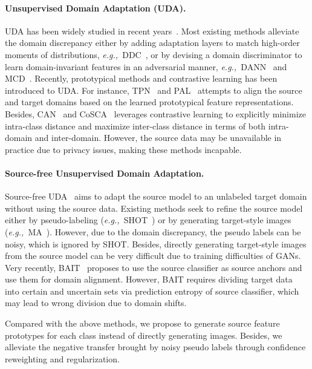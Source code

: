 \documentclass{article}
\def\eg{\emph{e.g.,~}}
\begin{document}
\paragraph{Unsupervised Domain Adaptation (UDA).}
UDA 
has been widely studied in recent years~\cite{tang2020unsupervised,jin2020minimum}. Most existing methods alleviate the domain discrepancy either by adding adaptation layers to match high-order moments of distributions, \eg DDC~\cite{Tzeng2014DeepDC}, 
or by devising a domain discriminator to learn domain-invariant features in an adversarial manner, \eg DANN~\cite{ganin2015unsupervised} and MCD~\cite{saito2018maximum}. 
Recently, prototypical methods and contrastive learning has been introduced to UDA. For instance, TPN~\cite{pan2019transferrable} and PAL~\cite{hu2020panda} attempts to align the source and target domains based on the learned prototypical feature representations. Besides, CAN~\cite{Kang2019ContrastiveAN} and CoSCA~\cite{Dai_2020_ACCV} leverages contrastive learning to explicitly minimize intra-class distance and maximize inter-class distance in terms of both intra-domain and inter-domain. However, the source data may be unavailable in practice due to privacy issues, making these methods incapable.


\paragraph{Source-free Unsupervised Domain Adaptation.}
Source-free UDA~\cite{kim2020progressive} aims to adapt the source model to an unlabeled target domain without using the source data. Existing methods seek to refine the source model either by pseudo-labeling (\eg SHOT~\cite{liang2020shot}) or by generating target-style images (\eg MA~\cite{Li2020ModelAU}). However, due to the domain discrepancy, the pseudo labels can be noisy, which is ignored by  SHOT. Besides, directly generating target-style images from the source model can be very difficult due to training difficulties of GANs. Very recently, BAIT~\cite{Yang2020UnsupervisedDA} proposes to use the source classifier as source anchors and use them for domain alignment.
However, BAIT requires dividing target data into certain and uncertain sets via prediction entropy of source classifier, which may lead to wrong division due to domain shifts.


Compared with the above methods,  we propose to generate source feature prototypes for each class instead of directly generating images. Besides, we alleviate the negative transfer brought by noisy pseudo labels through confidence reweighting and regularization.
\end{document}
